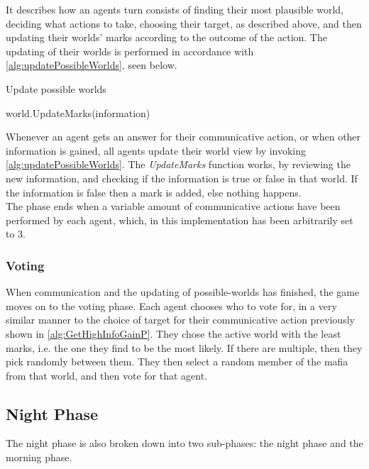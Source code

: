 \setcounter{algorithmcaption}{5}
It describes how an agents turn consists of finding their most plausible world,
deciding what actions to take, choosing their target, as described above, and
then updating their worlds' marks according to the outcome of the action.
The updating of their worlds is performed in accordance with
\cref{alg:updatePossibleWorlds}, seen below.
\begin{algorithm}[H]
	\caption{Update possible worlds}
	\begin{algorithmic}[1]
		\State world.UpdateMarks(information)
		\EndFor
		\EndFor
		\EndFunction
	\end{algorithmic}\label{alg:updatePossibleWorlds}
\end{algorithm}
\setcounter{algorithmcaption}{6}
Whenever an agent gets an answer for their communicative action, or when other information is gained, all agents update their
world view by invoking \cref{alg:updatePossibleWorlds}. The \textit{UpdateMarks} function works, by reviewing the new information, and checking if the information is true or false in that world. If the information is false then a mark is added, else nothing happens.\\

The phase ends when a variable amount of communicative actions have been
performed by each agent, which, in this implementation has been arbitrarily set
to 3.

\subsubsection{Voting}\label{sec:voting}
When communication and the updating of possible-worlds has finished, the game
moves on to the voting phase. Each agent chooses who to vote for, in a very
similar manner to the choice of target for their communicative action
previously shown in \cref{alg:GetHighInfoGainP}. They chose the active world
with the least marks, i.e. the one they find to be the most likely. If there
are multiple, then they pick randomly between them. They then select a random
member of the mafia from that world, and then vote for that agent.

\subsection{Night Phase}\label{sec:nightPhase}
The night phase is also broken down into two sub-phases: the night phase and
the morning phase.

